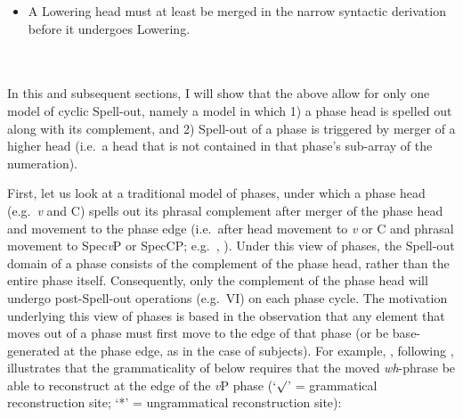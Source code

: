 \singlespacing
\begin{minipage}{5in}
\begin{itemize}
\item A Lowering head must at least be merged in the narrow syntactic derivation before it undergoes Lowering.
\end{itemize}
\end{minipage}\\\\
\onehalfspacing
In this and subsequent sections, I will show that the above allow for only one model of cyclic Spell-out, namely a model in which 1) a phase head is spelled out along with its complement, and 2) Spell-out of a phase is triggered by merger of a higher head (i.e.\ a head that is not contained in that phase's sub-array of the numeration).

First, let us look at a traditional model of phases, under which a phase head (e.g.\ {\it v} and C) spells out its phrasal complement after merger of the phase head and movement to the phase edge (i.e.\ after head movement to {\it v} or C and phrasal movement to Spec{\it v}P or SpecCP; e.g.\ , ). Under this view of phases, the Spell-out domain of a phase consists of the complement of the phase head, rather than the entire phase itself. Consequently, only the complement of the phase head will undergo post-Spell-out operations (e.g.\ VI) on each phase cycle. The motivation underlying this view of phases is based in the observation that any element that moves out of a phase must first move to the edge of that phase (or be base-generated at the phase edge, as in the case of subjects). For example, \citet{legate2003}, following \citet{fox2000}, illustrates that the grammaticality of \Next[a] below requires that the moved {\it wh}-phrase be able to reconstruct at the edge of the {\it v}P phase (`$\surd$' = grammatical reconstruction site; `*' = ungrammatical reconstruction site):


